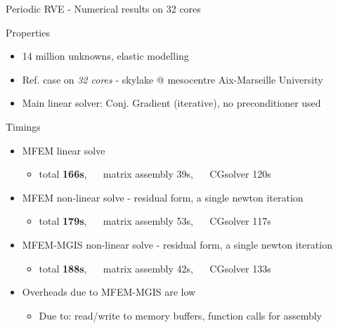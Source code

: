\documentclass{beamer}
\begin{document}
\begin{frame}{Periodic
    RVE - Numerical results on 32 cores}
  \begin{block}{Properties}
    \begin{itemize}
      \item 14 million unknowns, elastic modelling
      \item Ref. case on \emph{32 cores} - skylake @
      mesocentre Aix-Marseille University
      \item Main linear solver: Conj. Gradient (iterative),
      no preconditioner used
    \end{itemize}
  \end{block}
  \vspace*{2mm}
  \begin{block}{Timings}
    \begin{itemize}
      \item MFEM linear solve
      \begin{itemize}
        \item total \textbf{166s}, ~~ matrix assembly 39s,
        ~~ CGsolver 120s
      \end{itemize}
      \item MFEM non-linear solve - residual form, a single
      newton iteration
      \begin{itemize}
        \item total \textbf{179s}, ~~ matrix assembly 53s,
        ~~ CGsolver 117s
      \end{itemize}
      \item MFEM-MGIS non-linear solve - residual form, a
      single newton iteration
      \begin{itemize}
        \item total \textbf{188s}, ~~ matrix assembly 42s,
        ~~ CGsolver 133s
      \end{itemize}
      \item Overheads due to MFEM-MGIS are low
      \begin{itemize}
        \item Due to: read/write to memory buffers,
        function calls for assembly
      \end{itemize}
    \end{itemize}
  \end{block}
\end{frame}
\end{document}

